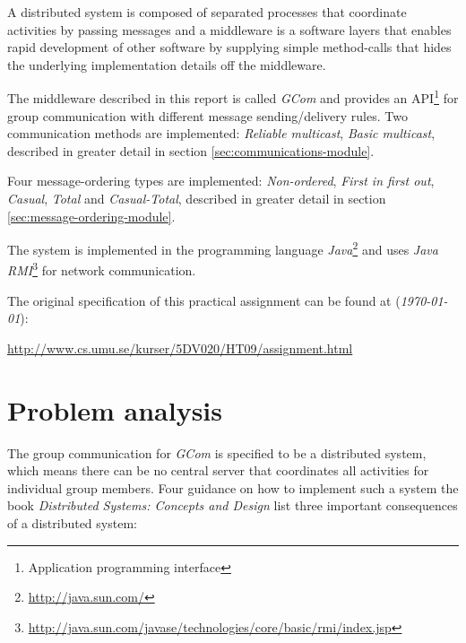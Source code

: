 \documentclass[titlepage, twocolumn, a4paper, 10pt]{article}
\begin{document}
A distributed system is composed of separated processes that
coordinate activities by passing messages and a middleware is a
software layers that enables rapid development of other software by
supplying simple method-calls that hides the underlying implementation
details off the middleware.

The middleware described in this report is called \textit{GCom} and
provides an API\footnote{Application programming interface} for group
communication with different message sending/delivery rules. Two
communication methods are implemented: \textit{Reliable multicast},
\textit{Basic multicast}, described in greater detail in section
\ref{sec:communications-module}.

Four message-ordering types are implemented: \textit{Non-ordered},
\textit{First in first out}, \textit{Casual}, \textit{Total} and
\textit{Casual-Total}, described in greater detail in section
\ref{sec:message-ordering-module}.

The system is implemented in the programming language
\textit{Java}\footnote{\url{http://java.sun.com/}} and uses \textit{Java
  RMI}\footnote{\url{http://java.sun.com/javase/technologies/core/basic/rmi/index.jsp}}
for network communication.

The original specification of this practical assignment can be found
at (\textit{\today}):\\
\begin{footnotesize}
  \url{http://www.cs.umu.se/kurser/5DV020/HT09/assignment.html}
\end{footnotesize}

\section{Problem analysis}\label{sec:problem-analysis}
The group communication for \textit{GCom} is specified to be a
distributed system, which means there can be no central server that
coordinates all activities for individual group members. Four guidance
on how to implement such a system the book \textit{Distributed
  Systems: Concepts and Design}\cite{book:dist-syst} list three
important consequences of a distributed system:
\end{document}
